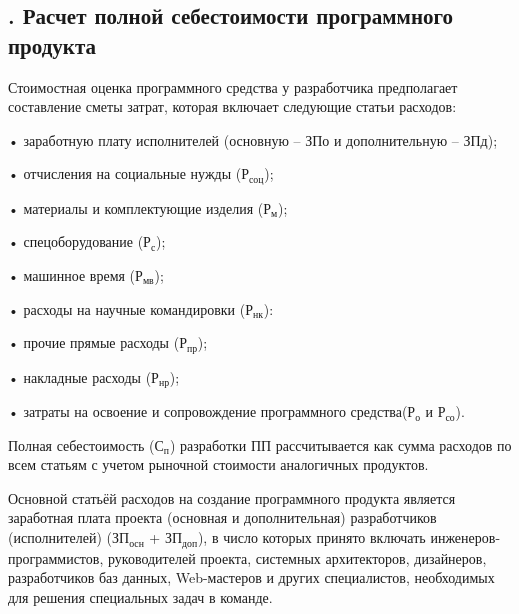 \subtitlespace

\subsection*{ 
	\gostTitleFont
	\redline
	\thechaptercntr .\thesubchaptercntr \spc
	Расчет полной себестоимости программного продукта
} \addtocounter{subchaptercntr}{1}

\subtitlespace

{\gostFont
	
	\par \redline Стоимостная оценка программного средства у разработчика предполагает составление сметы затрат, которая включает следующие статьи расходов:
	
	\par \redline • заработную плату исполнителей (основную – ЗПо и дополнительную – ЗПд);
	\par \redline •	отчисления на социальные нужды ($\textrm{Р}_{\textrm{соц}}$);
	\par \redline •	материалы и комплектующие изделия ($\textrm{Р}_{\textrm{м}}$);
	\par \redline •	спецоборудование ($\textrm{Р}_{\textrm{с}}$);
	\par \redline •	машинное время ($\textrm{Р}_{\textrm{мв}}$);
	\par \redline •	расходы на научные командировки ($\textrm{Р}_{\textrm{нк}}$):
	\par \redline •	прочие прямые расходы ($\textrm{Р}_{\textrm{пр}}$);
	\par \redline •	накладные расходы ($\textrm{Р}_{\textrm{нр}}$);
	\par \redline •	затраты на освоение и сопровождение программного средства($\textrm{Р}_{\textrm{о}}$ и $\textrm{Р}_{\textrm{со}}$).
	
	\par \redline Полная себестоимость ($\textrm{С}_{\textrm{п}}$) разработки ПП рассчитывается как сумма расходов по всем статьям с учетом рыночной стоимости аналогичных продуктов.
	
	\par \redline Основной статьёй расходов на создание программного продукта является заработная плата проекта (основная и дополнительная) разработчиков (исполнителей) ($\textrm{ЗП}_{\textrm{осн}}$ + $\textrm{ЗП}_{\textrm{доп}}$), в число которых принято включать инженеров-программистов, руководителей проекта, системных архитекторов, дизайнеров, разработчиков баз данных, Web-мастеров и  других специалистов, необходимых для решения специальных задач в команде.
	 
}
